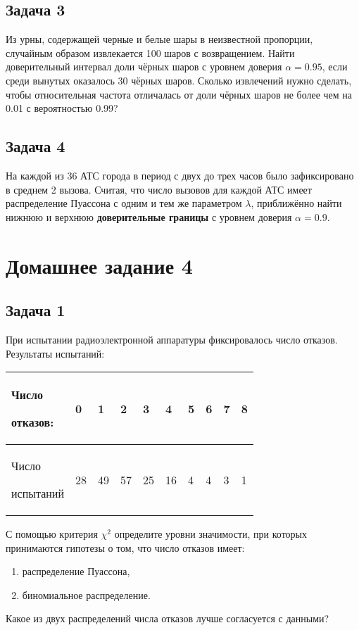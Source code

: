 \documentclass[a4paper,12pt]{article}
\begin{document}
\subsection*{Задача 3 \cite[187]{Efimov}}

Из урны, содержащей черные и белые шары в неизвестной пропорции, случайным образом извлекается 100 шаров с возвращением. Найти доверительный интервал
доли чёрных шаров с уровнем доверия $\alpha=0.95$, если среди вынутых оказалось 30 чёрных шаров. Сколько извлечений нужно сделать, чтобы относительная
частота отличалась от доли чёрных шаров не более чем на 0.01 с вероятностью 0.99?

\subsection*{Задача 4 \cite[191]{Efimov}}

На каждой из 36 АТС города в период с двух до трех часов было зафиксировано в среднем 2 вызова. Считая, что число вызовов для каждой АТС имеет
распределение Пуассона с одним и тем же параметром $\lambda$, приближённо найти нижнюю и верхнюю \textbf{доверительные границы} с уровнем
доверия $\alpha = 0.9$.

\section*{Домашнее задание 4}

\subsection*{Задача 1 \cite[291]{Efimov}}

При испытании радиоэлектронной аппаратуры фиксировалось число отказов. Результаты испытаний:

\begin{center}
    \begin{tabular}{|P{3cm}|P{1cm}|P{1cm}|P{1cm}|P{1cm}|P{1cm}|P{1cm}|P{1cm}|P{1cm}|P{1cm}|}
        \hline
        Число \par отказов:  & 0  & 1  & 2  & 3  & 4  & 5 & 6 & 7 & 8 \\
        \hline
        Число \par испытаний & 28 & 49 & 57 & 25 & 16 & 4 & 4 & 3 & 1 \\
        \hline
    \end{tabular}
\end{center}

С помощью критерия $\chi^2$ определите уровни значимости, при которых принимаются гипотезы о том, что число отказов имеет:
\begin{enumerate}
    \item распределение Пуассона,
    \item биномиальное распределение.
\end{enumerate}
Какое из двух распределений числа отказов лучше согласуется с данными?
\end{document}
